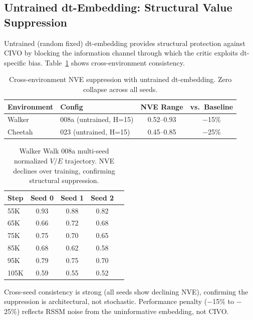 \documentclass[10pt,letterpaper]{article}
\begin{document}
\subsection{Untrained dt-Embedding: Structural Value Suppression}
\label{sec:untrained}

Untrained (random fixed) dt-embedding provides structural protection against CIVO by blocking the information channel through which the critic exploits dt-specific bias.
Table~\ref{tab:untrained_cross_env} shows cross-environment consistency.

\begin{table}[h]
\centering
\caption{Cross-environment NVE suppression with untrained dt-embedding. Zero collapse across all seeds.}
\label{tab:untrained_cross_env}
\begin{tabular}{llcc}
\toprule
Environment & Config & NVE Range & vs.\ Baseline \\
\midrule
Walker & 008a (untrained, H=15) & 0.52--0.93 & $-$15\% \\
Cheetah & 023 (untrained, H=15) & 0.45--0.85 & $-$25\% \\
\bottomrule
\end{tabular}
\end{table}

\begin{table}[h]
\centering
\caption{Walker Walk 008a multi-seed normalized $V/E$ trajectory. NVE declines over training, confirming structural suppression.}
\label{tab:008a_multiseed}
\begin{tabular}{lcccc}
\toprule
Step & Seed 0 & Seed 1 & Seed 2 \\
\midrule
55K & 0.93 & 0.88 & 0.82 \\
65K & 0.66 & 0.72 & 0.68 \\
75K & 0.75 & 0.70 & 0.65 \\
85K & 0.68 & 0.62 & 0.58 \\
95K & 0.79 & 0.75 & 0.70 \\
105K & 0.59 & 0.55 & 0.52 \\
\bottomrule
\end{tabular}
\end{table}

Cross-seed consistency is strong (all seeds show declining NVE), confirming the suppression is architectural, not stochastic.
Performance penalty ($-$15\% to $-$25\%) reflects RSSM noise from the uninformative embedding, not CIVO.

\end{document}
